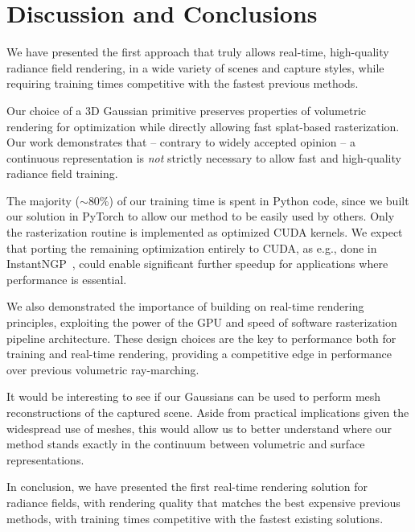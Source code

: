 
\section{Discussion and Conclusions}



We have presented the first approach that truly allows real-time, high-quality radiance field rendering, in a wide variety of scenes and capture styles, while requiring training times competitive with the fastest previous methods.

Our choice of a 3D Gaussian primitive preserves properties of volumetric rendering for optimization while directly allowing fast splat-based rasterization. Our work demonstrates that -- contrary to widely accepted opinion -- a continuous representation is \emph{not} strictly necessary to allow fast and high-quality radiance field training.

The majority ($\sim$80\%) of our training time is spent in Python code, since we built our solution in PyTorch to allow our method to be easily used by others. Only the rasterization routine is implemented as optimized CUDA kernels. We expect that porting the remaining optimization entirely to CUDA, as e.g., done in InstantNGP~\cite{mueller2022instant}, could enable significant further speedup for applications where performance is essential.

We also demonstrated the importance of building on real-time rendering principles, exploiting the power of the GPU and speed of software rasterization pipeline architecture. These design choices are the key to performance both for training and real-time rendering, providing a competitive edge in performance over previous volumetric ray-marching.

It would be interesting to see if our Gaussians can be used to perform mesh reconstructions of the captured scene. Aside from practical implications given the widespread use of meshes, this would allow us to better understand where our method stands exactly in the continuum between volumetric and surface representations.

In conclusion, we have presented the first real-time rendering solution for radiance fields, with rendering quality that matches the best expensive previous methods, with training times competitive with the fastest existing solutions.
